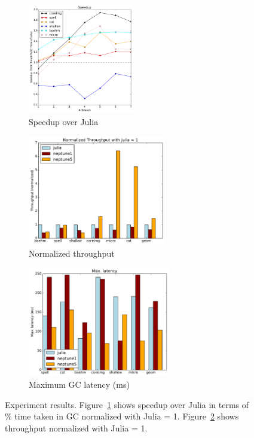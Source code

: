 \begin{figure}[h]
  \centering
    \begin{subfigure}{0.28\textwidth}
      \centering
      \includegraphics[height=4.8cm]{figures/speedup-julia.pdf}
      \caption{Speedup over Julia}
      \label{fig:speedup}
    \end{subfigure}
    \begin{subfigure}{0.34\textwidth}
      \centering
      \includegraphics[height=4.8cm]{figures/throughput-normalized-julia.pdf}
      
      \caption{Normalized throughput}
      \label{fig:throughput}
    \end{subfigure}
    \begin{subfigure}{0.34\textwidth}
      \centering
      \includegraphics[height=4.8cm]{figures/max-latency.pdf}
      \caption{Maximum GC latency (ms)\\}
      \label{fig:latency}
    \end{subfigure}
    \vspace{-0.5em}
    \caption{Experiment results. Figure~\ref{fig:speedup} shows speedup over Julia in terms of \% time taken in GC normalized with Julia = 1. Figure~\ref{fig:throughput} shows throughput normalized with Julia = 1.}
  \label{fig:results}
\end{figure}

